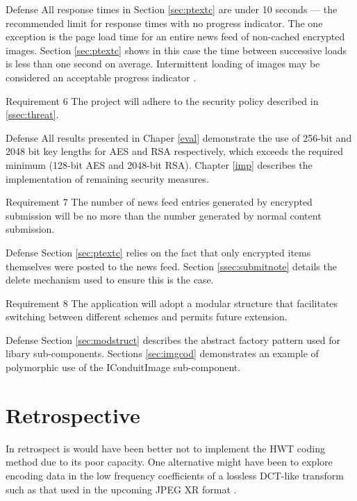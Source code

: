 \begin{desc}
    \item[Defense] All response times in Section \ref{sec:ptextc} are under 10 seconds --- the recommended limit for response times with no progress indicator. The one exception is the page load time for an entire news feed of non-cached encrypted images. Section \ref{sec:ptextc} shows in this case the time between successive loads is less than one second on average. Intermittent loading of images may be considered an acceptable progress indicator \cite{response}.

    \item[Requirement 6] The project will adhere to the security policy described in \ref{ssec:threat}.
    
    \item[Defense] All results presented in Chaper \ref{eval} demonstrate the use of 256-bit and 2048 bit key lengths for AES and RSA respectively, which exceeds the required minimum (128-bit AES and 2048-bit RSA). Chapter \ref{imp} describes the implementation of remaining security measures.

    \item[Requirement 7] The number of news feed entries generated by encrypted submission will be no more than the number generated by normal content submission.
    
    \item[Defense] Section \ref{sec:ptextc} relies on the fact that only encrypted items themselves were posted to the news feed. Section \ref{ssec:submitnote} details the delete mechanism used to ensure this is the case.
    

    \item[Requirement 8] The application will adopt a modular structure that facilitates switching between different schemes and permits future extension.
    
    \item[Defense] Section \ref{sec:modstruct} describes the abstract factory pattern used for libary sub-components. Sections \ref{sec:imgcod} demonstrates an example of polymorphic use of the IConduitImage sub-component.
    
\end{desc}



\section{Retrospective}
\label{sec:retro}

In retrospect is would have been better not to implement the HWT coding method due to its poor capacity. One alternative might have been to explore encoding data in the low frequency coefficients of a lossless DCT-like transform such as that used in the upcoming JPEG XR format \cite{jpegxr}.

